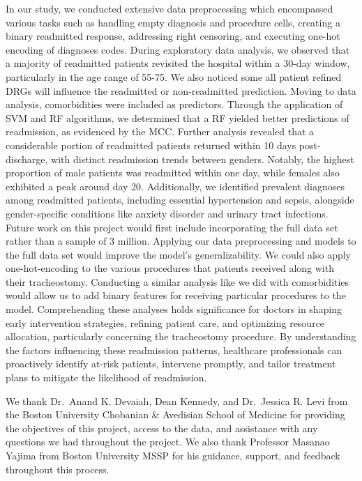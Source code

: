 \documentclass[sn-basic,pdflatex]{sn-jnl}
\theoremstyle{remark}
\theoremstyle{definition}
\begin{document}
In our study, we conducted extensive data preprocessing which
encompassed various tasks such as handling empty diagnosis and procedure
cells, creating a binary readmitted response, addressing right
censoring, and executing one-hot encoding of diagnoses codes. During
exploratory data analysis, we observed that a majority of readmitted
patients revisited the hospital within a 30-day window, particularly in
the age range of 55-75. We also noticed some all patient refined DRGs
will influence the readmitted or non-readmitted prediction. Moving to
data analysis, comorbidities were included as predictors. Through the
application of SVM and RF algorithms, we determined that a RF yielded
better predictions of readmission, as evidenced by the MCC. Further
analysis revealed that a considerable portion of readmitted patients
returned within 10 days post-discharge, with distinct readmission trends
between genders. Notably, the highest proportion of male patients was
readmitted within one day, while females also exhibited a peak around
day 20. Additionally, we identified prevalent diagnoses among readmitted
patients, including essential hypertension and sepsis, alongside
gender-specific conditions like anxiety disorder and urinary tract
infections. \newline \newline Future work on this project would first
include incorporating the full data set rather than a sample of 3
million. Applying our data preprocessing and models to the full data set
would improve the model's generalizability. We could also apply
one-hot-encoding to the various procedures that patients received along
with their tracheostomy. Conducting a similar analysis like we did with
comorbidities would allow us to add binary features for receiving
particular procedures to the model. \newline \newline Comprehending
these analyses holds significance for doctors in shaping early
intervention strategies, refining patient care, and optimizing resource
allocation, particularly concerning the tracheostomy procedure. By
understanding the factors influencing these readmission patterns,
healthcare professionals can proactively identify at-risk patients,
intervene promptly, and tailor treatment plans to mitigate the
likelihood of readmission. \newpage {}

We thank Dr.~Anand K. Devaiah, Dean Kennedy, and Dr.~Jessica R. Levi
from the Boston University Chobanian \& Avedisian School of Medicine for
providing the objectives of this project, access to the data, and
assistance with any questions we had throughout the project. We also
thank Professor Masanao Yajima from Boston University MSSP for his
guidance, support, and feedback throughout this process.
\end{document}
